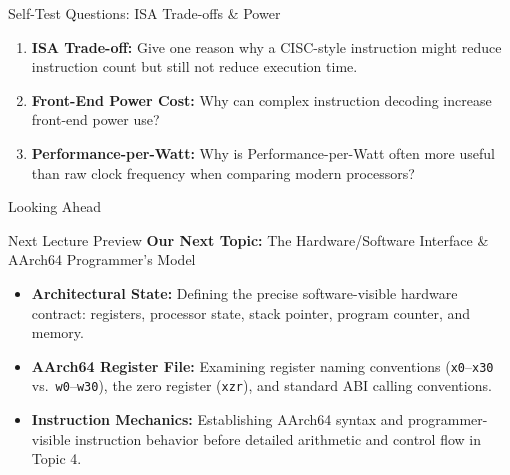 \documentclass[aspectratio=169,11pt,t]{beamer}
\newcommand{\key}[1]{\textbf{#1}}
\newcommand{\bits}[1]{\texttt{#1}}
\begin{document}

\begin{frame}{Self-Test Questions: ISA Trade-offs \& Power}
\vfill
\begin{enumerate}\setlength{\itemsep}{12pt}
  \item \key{ISA Trade-off:} Give one reason why a CISC-style instruction might reduce instruction count but still not reduce execution time.

  \item \key{Front-End Power Cost:} Why can complex instruction decoding increase front-end power use?

  \item \key{Performance-per-Watt:} Why is Performance-per-Watt often more useful than raw clock frequency when comparing modern processors?
\end{enumerate}
\vfill
\end{frame}












\begin{frame}{Looking Ahead}
\vfill
\begin{block}{Next Lecture Preview}
\key{Our Next Topic:} The Hardware/Software Interface \& AArch64 Programmer's Model
\end{block}

\vfill
\begin{itemize}\setlength{\itemsep}{7pt}
  \item \key{Architectural State:} Defining the precise software-visible hardware contract: registers, processor state, stack pointer, program counter, and memory.
  \item \key{AArch64 Register File:} Examining register naming conventions (\bits{x0}--\bits{x30} vs.\ \bits{w0}--\bits{w30}), the zero register (\bits{xzr}), and standard ABI calling conventions.
  \item \key{Instruction Mechanics:} Establishing AArch64 syntax and programmer-visible instruction behavior before detailed arithmetic and control flow in Topic 4.
\end{itemize}
\vfill
\end{frame}
\end{document}
